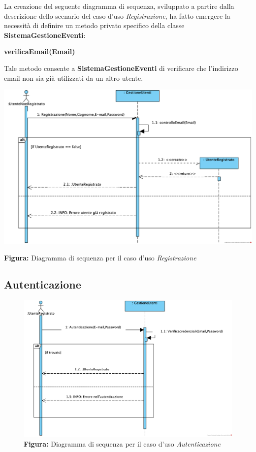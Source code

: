 \begin{center}
    La creazione del seguente diagramma di sequenza, sviluppato a partire dalla descrizione dello scenario del caso d’uso \textit{Registrazione}, ha fatto emergere la necessità di definire un metodo privato specifico della classe \textbf{SistemaGestioneEventi}:

    \vspace{1ex}
    \textbf{verificaEmail(Email)}

    \vspace{2ex}
    Tale metodo consente a \textbf{SistemaGestioneEventi} di verificare che l’indirizzo email  non sia già utilizzati da un altro utente.

    \vspace{3ex}
    \includegraphics[width=0.8\linewidth]{assets/casid'uso/Registrazione.png}
    
    \vspace{1ex}
    \textbf{Figura:} Diagramma di sequenza per il caso d’uso \textit{Registrazione}
\end{center}
\subsection{Autenticazione}
\begin{figure}[!ht]
    \hspace*{4cm} 
    \includegraphics[width=0.8\linewidth]{assets/casid'uso/Autenticazione.png}
	\vspace{1ex}
    \textbf{Figura:} Diagramma di sequenza per il caso d’uso \textit{Autenticazione}
\end{figure}
